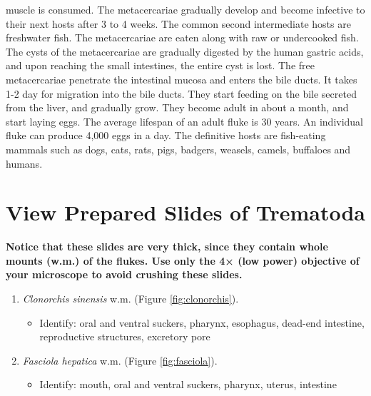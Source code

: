\documentclass[]{book}
\providecommand{\tightlist}{%
  \setlength{\itemsep}{0pt}\setlength{\parskip}{0pt}}
\theoremstyle{definition}
\theoremstyle{definition}
\theoremstyle{definition}
\theoremstyle{remark}
\let\BeginKnitrBlock\begin \let\EndKnitrBlock\end
\begin{document}
muscle is consumed. The metacercariae gradually develop and become
infective to their next hosts after 3 to 4 weeks. The common second
intermediate hosts are freshwater fish. The metacercariae are eaten
along with raw or undercooked fish. The cysts of the metacercariae are
gradually digested by the human gastric acids, and upon reaching the
small intestines, the entire cyst is lost. The free metacercariae
penetrate the intestinal mucosa and enters the bile ducts. It takes 1-2
day for migration into the bile ducts. They start feeding on the bile
secreted from the liver, and gradually grow. They become adult in about
a month, and start laying eggs. The average lifespan of an adult fluke
is 30 years. An individual fluke can produce 4,000 eggs in a day. The
definitive hosts are fish-eating mammals such as dogs, cats, rats, pigs,
badgers, weasels, camels, buffaloes and humans.

\section{View Prepared Slides of
Trematoda}\label{view-prepared-slides-trematoda}

\BeginKnitrBlock{rmdcaution}
\textbf{Notice that these slides are very thick, since they contain
whole mounts (w.m.) of the flukes. Use only the 4× (low power) objective
of your microscope to avoid crushing these slides.}
\EndKnitrBlock{rmdcaution}

\begin{enumerate}
\def\labelenumi{\arabic{enumi}.}
\tightlist
\item
  \emph{Clonorchis sinensis} w.m. (Figure \ref{fig:clonorchis}).

  \begin{itemize}
  \tightlist
  \item
    Identify: oral and ventral suckers, pharynx, esophagus, dead-end
    intestine, reproductive structures, excretory pore
  \end{itemize}
\item
  \emph{Fasciola hepatica} w.m. (Figure \ref{fig:fasciola}).

  \begin{itemize}
  \tightlist
  \item
    Identify: mouth, oral and ventral suckers, pharynx, uterus,
    intestine
  \end{itemize}
\end{enumerate}
\end{document}
